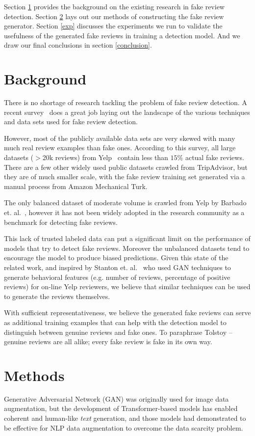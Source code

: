 \documentclass[conference, 11pt]{IEEEtran} %
\theoremstyle{plain}
\theoremstyle{definition}
\begin{document}
Section \ref{bg} provides the background on the existing research in fake review detection. Section \ref{methods} lays out our methods of constructing the fake review generator. Section \ref{exp} discusses the experiments we run to validate the usefulness of the generated fake reviews in training a detection model. And we draw our final conclusions in section \ref{conclusion}.


\section{Background}
\label{bg}
There is no shortage of research tackling the problem of fake review detection. A recent survey~\cite{Mohawesh2021} does a great job laying out the landscape of the various techniques and data sets used for fake review detection.

However, most of the publicly available data sets are very skewed with many much real review examples than fake ones. According to this survey, all large datasets ($>$20k reviews) from Yelp~\cite{rayana2015collective} contain less than $15\%$ actual fake reviews. There are a few other widely used public datasets crawled from TripAdvisor, but they are of much smaller scale, with the fake review training set generated via a manual process from Amazon Mechanical Turk.

The only balanced dataset of moderate volume is crawled from Yelp by Barbado et. al.~\cite{barbado2019framework}, however it has not been widely adopted in the research community as a benchmark for detecting fake reviews.

This lack of trusted labeled data can put a significant limit on the performance of models that try to detect fake reviews. Moreover the unbalanced datasets tend to encourage the model to produce biased predictions. Given this state of the related work, and inspired by Stanton et. al.~\cite{stanton2019gans} who used GAN techniques to generate behavioral features (e.g. number of reviews, percentage of positive reviews) for on-line Yelp reviewers, we believe that similar techniques can be used to generate the reviews themselves.

With sufficient representativeness, we believe the generated fake reviews can serve as additional training examples that can help with the detection model to distinguish between genuine reviews and fake ones. To paraphrase Tolstoy --  genuine reviews are all alike; every fake review is fake in its own way.


\section{Methods}
\label{methods}
Generative Adversarial Network (GAN) was originally used for image data augmentation, but the development of Transformer-based models has enabled coherent and human-like \textit{text} generation, and those models had demonstrated to be effective for NLP data augmentation to overcome the data scarcity problem.
\end{document}
